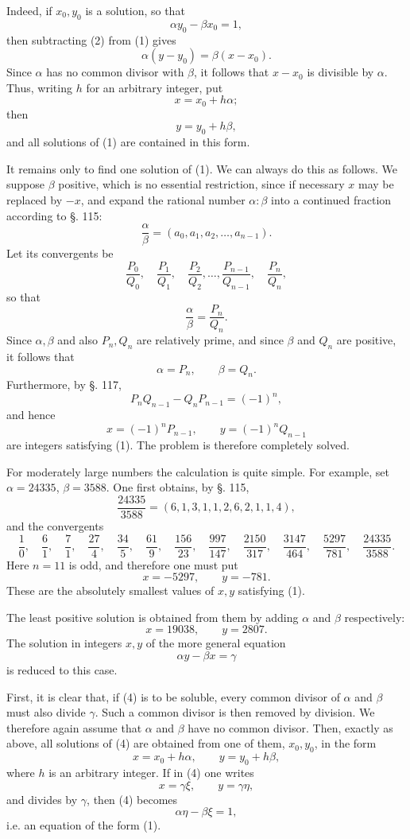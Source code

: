 \documentclass[11pt]{article}
\begin{document}
Indeed, if $x_0,y_0$ is a solution, so that
\[
\tag{2}        \alpha y_0-\beta x_0=1,
\]
then subtracting (2) from (1) gives
\[
        \alpha(y-y_0)=\beta(x-x_0).
\]
Since $\alpha$ has no common divisor with $\beta$, it follows that $x-x_0$ is divisible by $\alpha$. Thus, writing $h$ for an arbitrary integer, put
\[
        x=x_0+h\alpha;
\]
then
\[
        y=y_0+h\beta,
\]
and all solutions of (1) are contained in this form.

It remains only to find one solution of (1). We can always do this as follows. We suppose $\beta$ positive, which is no essential restriction, since if necessary $x$ may be replaced by $-x$, and expand the rational number $\alpha:\beta$ into a continued fraction according to §. 115:
\[
        \frac{\alpha}{\beta}=(a_0,a_1,a_2,\ldots,a_{n-1}).
\]
Let its convergents be
\[
        \frac{P_0}{Q_0},\quad \frac{P_1}{Q_1},\quad \frac{P_2}{Q_2},\ldots,
        \frac{P_{n-1}}{Q_{n-1}},\quad \frac{P_n}{Q_n},
\]
so that
\[
        \frac{\alpha}{\beta}=\frac{P_n}{Q_n}.
\]
Since $\alpha,\beta$ and also $P_n,Q_n$ are relatively prime, and since $\beta$ and $Q_n$ are positive, it follows that
\[
        \alpha=P_n,
        \qquad
        \beta=Q_n.
\]
Furthermore, by §. 117,
\[
        P_nQ_{n-1}-Q_nP_{n-1}=(-1)^n,
\]
and hence
\[
\tag{3}        x=(-1)^nP_{n-1},\qquad y=(-1)^nQ_{n-1}
\]
are integers satisfying (1). The problem is therefore completely solved.

For moderately large numbers the calculation is quite simple. For example, set $\alpha=24335$, $\beta=3588$. One first obtains, by §. 115,
\[
        \frac{24335}{3588}=(6,1,3,1,1,2,6,2,1,1,4),
\]
and the convergents
\[
\frac10,\quad \frac61,\quad \frac71,\quad \frac{27}4,
\quad \frac{34}5,
\quad \frac{61}9,
\quad \frac{156}{23},
\quad \frac{997}{147},
\quad \frac{2150}{317},
\quad \frac{3147}{464},
\quad \frac{5297}{781},
\quad \frac{24335}{3588}.
\]
Here $n=11$ is odd, and therefore one must put
\[
        x=-5297,
        \qquad
        y=-781.
\]
These are the absolutely smallest values of $x,y$ satisfying (1).

The least positive solution is obtained from them by adding $\alpha$ and $\beta$ respectively:
\[
        x=19038,
        \qquad
        y=2807.
\]
The solution in integers $x,y$ of the more general equation
\[
\tag{4}        \alpha y-\beta x=\gamma
\]
is reduced to this case.

First, it is clear that, if (4) is to be soluble, every common divisor of $\alpha$ and $\beta$ must also divide $\gamma$. Such a common divisor is then removed by division. We therefore again assume that $\alpha$ and $\beta$ have no common divisor. Then, exactly as above, all solutions of (4) are obtained from one of them, $x_0,y_0$, in the form
\[
        x=x_0+h\alpha,
        \qquad
        y=y_0+h\beta,
\]
where $h$ is an arbitrary integer. If in (4) one writes
\[
        x=\gamma\xi,
        \qquad
        y=\gamma\eta,
\]
and divides by $\gamma$, then (4) becomes
\[
        \alpha\eta-\beta\xi=1,
\]
i.e. an equation of the form (1).
\end{document}
